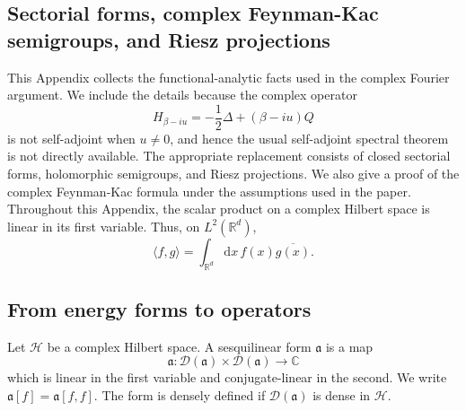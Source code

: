 \documentclass[11pt,reqno]{amsart}
\theoremstyle{definition}
\numberwithin{equation}{section}
\newcommand{\<}{\langle}
\renewcommand{\>}{\rangle}
\def\de{{\rm d}}
\def\de{{\mathrm {d}}}
\begin{document}
\begin{appendix}





\section{Sectorial forms, complex Feynman-Kac semigroups, and Riesz projections}
\label{sec:sectorial-background}

This Appendix collects the functional-analytic facts used in the complex
Fourier argument.  We include the details because the complex operator
\[
        H_{\beta-iu}=-\frac12\Delta+(\beta-iu)Q
\]
is not self-adjoint when $u\neq0$, and hence the usual self-adjoint spectral
theorem is not directly available.  The appropriate replacement consists of
closed sectorial forms, holomorphic semigroups, and Riesz projections.  We
also give a proof of the complex Feynman-Kac formula under the assumptions
used in the paper.
Throughout this Appendix, the scalar product on a complex Hilbert space is
linear in its first variable.  Thus, on $L^2(\mathbb R^d)$,
\[
        \langle f,g\rangle=\int_{\mathbb R^d}\de x \,f(x)\overline{g(x)}.
\]
\subsection{From energy forms to operators}
\label{subsec:forms-to-operators}

Let $\mathcal H$ be a complex Hilbert space.  A sesquilinear form
$\mathfrak a$ is a map
\[
  \mathfrak a:\mathcal D(\mathfrak a)\times\mathcal D(\mathfrak a)
  \longrightarrow\mathbb C
\]
which is linear in the first variable and conjugate-linear in the second.  We
write $\mathfrak a[f]=\mathfrak a[f,f]$.  The form is densely defined if
$\mathcal D(\mathfrak a)$ is dense in $\mathcal H$.


\end{appendix}
\end{document}
